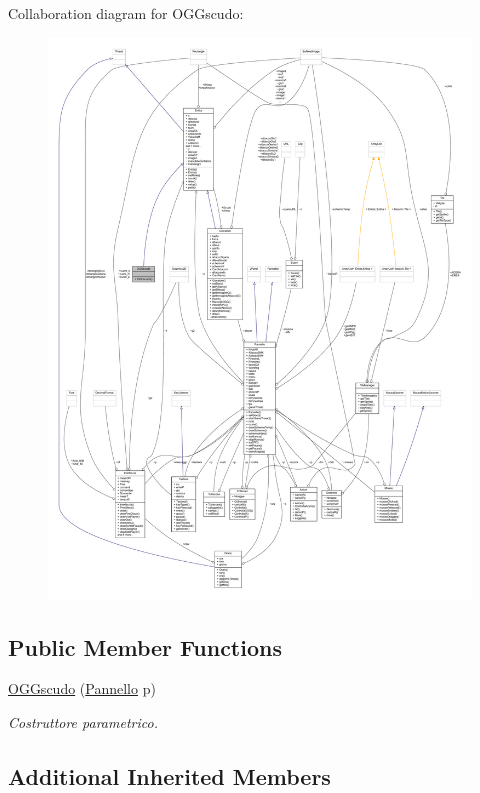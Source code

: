 Collaboration diagram for O\+G\+Gscudo\+:
\nopagebreak
\begin{figure}[H]
\begin{center}
\leavevmode
\includegraphics[width=350pt]{classoggetti_1_1_o_g_gscudo__coll__graph}
\end{center}
\end{figure}
\subsection*{Public Member Functions}
\begin{DoxyCompactItemize}
\item 
\hyperlink{classoggetti_1_1_o_g_gscudo_a21b65d2d8342c79e0340781948808f20}{O\+G\+Gscudo} (\hyperlink{classa_1_1survival_1_1game_1_1_pannello}{Pannello} p)
\begin{DoxyCompactList}\small\item\em Costruttore parametrico. \end{DoxyCompactList}\end{DoxyCompactItemize}
\subsection*{Additional Inherited Members}


